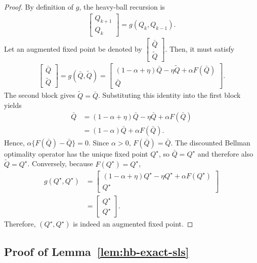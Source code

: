 \documentclass[letterpaper]{article}
\numberwithin{equation}{section}
\begin{document}
\begin{proof}
By definition of $g$, the heavy-ball recursion is
\begin{align*}
  \begin{bmatrix}Q_{k+1}\\Q_k\end{bmatrix}=g(Q_k,Q_{k-1}).
\end{align*}
Let an augmented fixed point be denoted by $\begin{bmatrix}\bar Q\\\tilde Q\end{bmatrix}$. Then, it must satisfy
\begin{align*}
  \begin{bmatrix}\bar Q\\\tilde Q\end{bmatrix}
  =g(\bar Q,\tilde Q)
  =
  \begin{bmatrix}
    (1-\alpha+\eta)\bar Q-\eta\tilde Q+\alpha F(\bar Q)\\
    \bar Q
  \end{bmatrix}.
\end{align*}
The second block gives $\tilde Q=\bar Q$. Substituting this identity into the
first block yields
\begin{align*}
  \bar Q
  &=(1-\alpha+\eta)\bar Q-\eta\bar Q+\alpha F(\bar Q)\\
  &=(1-\alpha)\bar Q+\alpha F(\bar Q).
\end{align*}
Hence, $\alpha\{F(\bar Q)-\bar Q\}=0$. Since $\alpha>0$, $F(\bar Q)=\bar Q$. The discounted Bellman optimality operator
has the unique fixed point $Q^\star$, so $\bar Q=Q^\star$ and therefore also
$\tilde Q=Q^\star$. Conversely, because $F(Q^\star)=Q^\star$,
\begin{align*}
g(Q^\star,Q^\star)
  &=
  \begin{bmatrix}
    (1-\alpha+\eta)Q^\star-\eta Q^\star+\alpha F(Q^\star)\\
    Q^\star
  \end{bmatrix}\\
  &=
  \begin{bmatrix}Q^\star\\Q^\star\end{bmatrix}.
\end{align*}
Therefore, $(Q^\star,Q^\star)$ is indeed an augmented fixed point.
\end{proof}

\subsection{Proof of Lemma~\ref{lem:hb-exact-sls}}
\label{app:proof-lem-hb-exact-sls}
\end{document}
